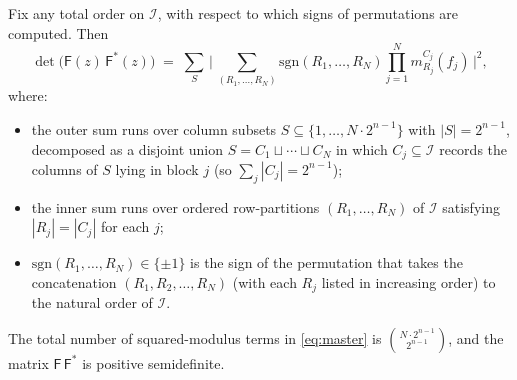 \documentclass[11pt]{amsart}
\begin{document}
\begin{thm}\label{thm:master-formula}
Fix any total order on $\mathcal I$, with respect to which signs of permutations are computed. Then
\begin{equation}\label{eq:master}
\det\bigl(\mathsf{F}(z)\,\mathsf{F}^{\ast}(z)\bigr)
\;=\; \sum_{S} \,\Biggl|\,\sum_{(R_1,\ldots,R_N)} \mathrm{sgn}(R_1, \ldots, R_N) \prod_{j=1}^{N} m_{R_j}^{C_j}(f_j)\,\Biggr|^2,
\end{equation}
where:
\begin{itemize}
\item the outer sum runs over column subsets $S \subseteq \{1, \ldots, N \cdot 2^{n-1}\}$ with $|S| = 2^{n-1}$, decomposed as a disjoint union $S = C_1 \sqcup \cdots \sqcup C_N$ in which $C_j \subseteq \mathcal I$ records the columns of $S$ lying in block $j$ (so $\sum_j |C_j| = 2^{n-1}$);
\item the inner sum runs over ordered row-partitions $(R_1, \ldots, R_N)$ of $\mathcal I$ satisfying $|R_j| = |C_j|$ for each $j$;
\item $\mathrm{sgn}(R_1, \ldots, R_N) \in \{\pm 1\}$ is the sign of the permutation that takes the concatenation $(R_1, R_2, \ldots, R_N)$ (with each $R_j$ listed in increasing order) to the natural order of $\mathcal I$.
\end{itemize}
The total number of squared-modulus terms in \eqref{eq:master} is $\displaystyle\binom{N \cdot 2^{n-1}}{2^{n-1}}$, and the matrix $ \mathsf{F}\, \mathsf{F}^*$ is positive semidefinite.
\end{thm}
\end{document}
